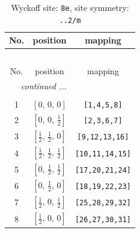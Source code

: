 \documentclass[fleqn,8pt]{jsarticle}
\begin{document}
\begin{longtable}{ccc}
\caption{Wyckoff site: {\tt 8e}, site symmetry: {\tt ..2/m}}
 \\
 \hline \hline
No. & position & mapping \\ \hline \endfirsthead

\multicolumn{2}{l}{\tablename\ \thetable{}} \\
 \hline \hline
No. & position & mapping \\ \hline \endhead

 \hline \hline
\multicolumn{2}{r}{\footnotesize\it continued ...} \\ \endfoot

 \hline \hline
\multicolumn{2}{r}{} \\ \endlastfoot

1 & $\left[ 0,\, 0,\, 0 \right]$ & {\tt [1,4,5,8]} \\ \hline
2 & $\left[ 0,\, 0,\, \frac{1}{2} \right]$ & {\tt [2,3,6,7]} \\ \hline
3 & $\left[ \frac{1}{2},\, \frac{1}{2},\, 0 \right]$ & {\tt [9,12,13,16]} \\ \hline
4 & $\left[ \frac{1}{2},\, \frac{1}{2},\, \frac{1}{2} \right]$ & {\tt [10,11,14,15]} \\ \hline
5 & $\left[ 0,\, \frac{1}{2},\, \frac{1}{2} \right]$ & {\tt [17,20,21,24]} \\ \hline
6 & $\left[ 0,\, \frac{1}{2},\, 0 \right]$ & {\tt [18,19,22,23]} \\ \hline
7 & $\left[ \frac{1}{2},\, 0,\, \frac{1}{2} \right]$ & {\tt [25,28,29,32]} \\ \hline
8 & $\left[ \frac{1}{2},\, 0,\, 0 \right]$ & {\tt [26,27,30,31]} \\
\end{longtable}
\renewcommand{\arraystretch}{1.2}
\end{document}
